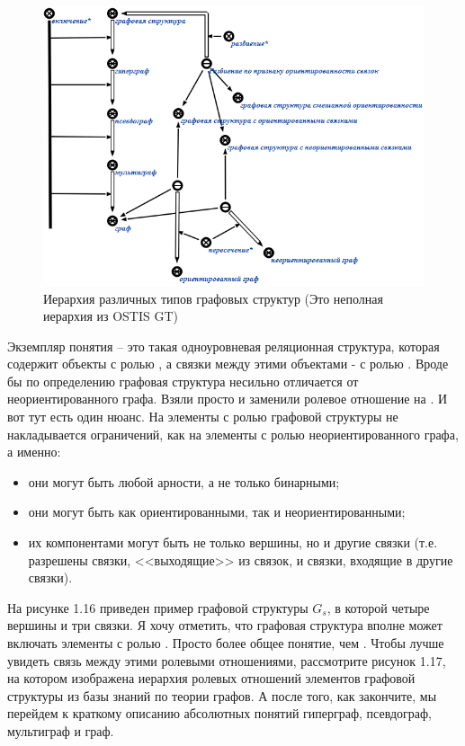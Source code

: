 \begin{figure}[h!]
  \centering
  \includegraphics[scale=0.7]{images/2/Hierarchy_of_graphs_types}
  \caption{Иерархия различных типов графовых структур (Это неполная
    иерархия из OSTIS GT)}
  \label{fig:Hierarchy_of_graphs_types}
\end{figure}

Экземпляр понятия  – это такая одноуровневая
реляционная структура, которая содержит объекты с ролью
, а связки между этими объектами - с ролью
. Вроде бы по определению графовая структура несильно
отличается от неориентированного графа. Взяли просто и заменили
ролевое отношение  на . И вот тут есть один
нюанс. На элементы с ролью  графовой структуры не
накладывается ограничений, как на элементы с ролью 
неориентированного графа, а именно:

\begin{itemize}
\item они могут быть любой арности, а не только бинарными;
\item они могут быть как ориентированными, так и неориентированными;
\item их компонентами могут быть не только вершины, но и другие связки
  (т.е. разрешены связки, <<выходящие>> из связок, и связки, входящие
  в другие связки).
\end{itemize}

На рисунке 1.16 приведен пример графовой структуры $G_s$, в которой
четыре вершины и три связки. Я хочу отметить, что графовая структура
вполне может включать элементы с ролью . Просто
 более общее понятие, чем . Чтобы лучше
увидеть связь между этими ролевыми отношениями, рассмотрите рисунок
1.17, на котором изображена иерархия ролевых отношений элементов
графовой структуры из базы знаний по теории графов. А после того, как
закончите, мы перейдем к краткому описанию абсолютных понятий
гиперграф, псевдограф, мультиграф и граф.
 

